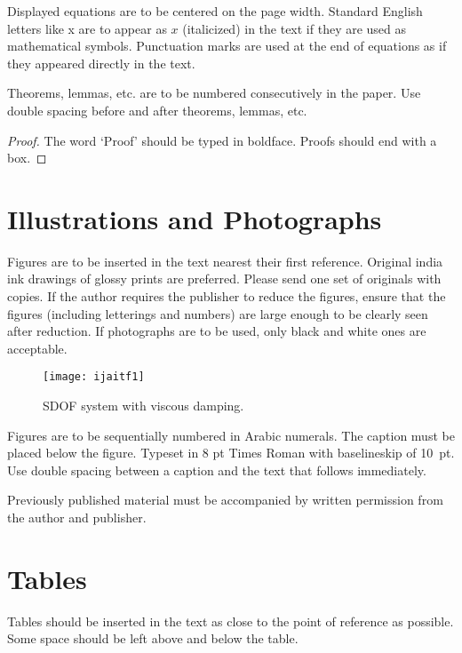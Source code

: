 \documentclass{ws-ijait}
\begin{document}
Displayed equations are to be centered on the page width.
Standard English letters like x are to appear as $x$
(italicized) in the text if they are used as mathematical
symbols. Punctuation marks are used at the end of equations as
if they appeared directly in the text.

\begin{theorem}
Theorems, lemmas, etc. are to be numbered
consecutively in the paper. Use double spacing before and after
theorems, lemmas, etc.
\end{theorem}

\begin{proof}
The word `Proof' should be typed in boldface. Proofs should end with
a box.
\end{proof}

\section{Illustrations and Photographs}

Figures are to be inserted in the text nearest their first
reference.  Original india ink drawings of glossy prints are
preferred. Please send one set of originals with copies. If the
author requires the publisher to reduce the figures, ensure that
the figures (including letterings and numbers) are large enough
to be clearly seen after reduction. If photographs are to be
used, only black and white ones are acceptable.

\begin{figure}[th]
\centerline{\texttt{[image: ijaitf1]}}
\vspace*{8pt}
\caption{SDOF system with viscous damping.}
\end{figure}

Figures are to be sequentially numbered in Arabic numerals. The
caption must be placed below the figure. Typeset in 8 pt Times
Roman with baselineskip of 10~pt. Use double spacing between a
caption and the text that follows immediately.

Previously published material must be accompanied by written
permission from the author and publisher.

\section{Tables}

Tables should be inserted in the text as close to the point of
reference as possible. Some space should be left above and below
the table.
\end{document}
